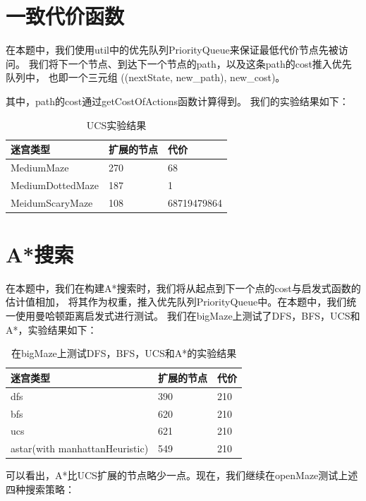 \documentclass{article}
\begin{document}
\section{一致代价函数}
在本题中，我们使用util中的优先队列PriorityQueue来保证最低代价节点先被访问。
我们将下一个节点、到达下一个节点的path，以及这条path的cost推入优先队列中，
也即一个三元组
((nextState, new_path), new_cost)。

其中，path的cost通过getCostOfActions函数计算得到。
我们的实验结果如下：

\begin{table}[H]
	\centering
	\caption{UCS实验结果}
	\begin{tabular}{lll}
		\hline
	迷宫类型             & 扩展的节点 & 代价          \\
	\hline
	MediumMaze       & 270   & 68          \\
	MediumDottedMaze & 187   & 1           \\
	MeidumScaryMaze  & 108   &  68719479864\\
	\hline
	\end{tabular}
	\end{table}


\section{A*搜索}
在本题中，我们在构建A*搜索时，我们将从起点到下一个点的cost与启发式函数的估计值相加，
将其作为权重，推入优先队列PriorityQueue中。在本题中，我们统一使用曼哈顿距离启发式进行测试。
我们在bigMaze上测试了DFS，BFS，UCS和A*，实验结果如下：

\begin{table}[H]
	\centering
	\caption{在bigMaze上测试DFS，BFS，UCS和A*的实验结果}
	\begin{tabular}{lll}
		\hline
	迷宫类型                           & 扩展的节点 & 代价  \\
	\hline
	dfs                            & 390   & 210 \\
	bfs                            & 620   & 210 \\
	ucs                            & 621   & 210 \\
	astar(with manhattanHeuristic) & 549   & 210\\ \hline
	\end{tabular}
	\end{table}

	可以看出，A*比UCS扩展的节点略少一点。现在，我们继续在openMaze测试上述四种搜索策略：
\end{document}
